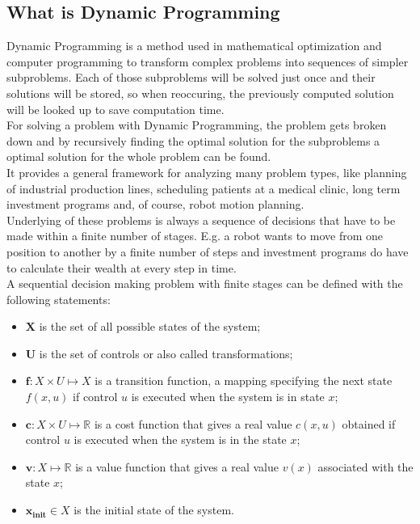 \documentclass[conference]{IEEEtran}
\begin{document}
\subsection{What is Dynamic Programming}
Dynamic Programming is a method used in mathematical optimization and computer programming to transform complex problems into sequences of simpler subproblems. Each of those subproblems will be solved just once and their solutions will be stored, so when reoccuring, the previously computed solution will be looked up to save computation time.
\\
For solving a problem with Dynamic Programming, the problem gets broken down and by recursively finding the optimal solution for the subproblems a optimal solution for the whole problem can be found.
\\
It provides a general framework for analyzing many problem types, like planning of industrial production lines, scheduling patients at a medical clinic, long term investment programs and, of course, robot motion planning.
\\
Underlying of these problems is always a sequence of decisions that have to be made within a finite number of stages. E.g. a robot wants to move from one position to another by a finite number of steps and investment programs do have to calculate their wealth at every step in time.\\
A sequential decision making problem with finite stages can be defined with the following statements:
\begin{itemize}
\item $\mathbf{X}$ is the set of all possible states of the system;
\item $\mathbf{U}$ is the set of controls or also called transformations;
\item $\mathbf{f}: X \times U \mapsto X$ is a transition function, a mapping specifying the next state $f(x,u)$ if control $u$ is executed when the system is in state $x$;
\item $\mathbf{c}: X \times U \mapsto \mathbb{R}$ is a cost function that gives a real value $c(x, u)$ obtained if control $u$ is executed when the system is in the state $x$;
\item $\mathbf{v}: X \mapsto \mathbb{R}$ is a value function that gives a real value $v(x)$ associated with the state $x$;
\item $\mathbf{x_\text{init}} \in X$ is the initial state of the system. \cite{OktayArslan.December2015}
\end{itemize}
\end{document}
